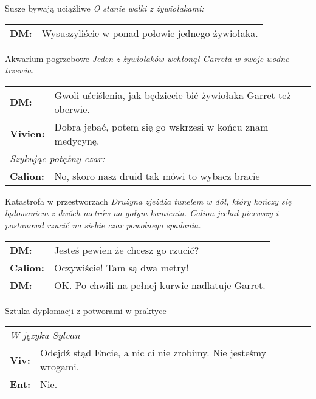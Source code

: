 \documentclass[10pt,twoside,twocolumn]{book}
\begin{document}
\begin{rpg-quotebox}{Susze bywają uciążliwe}
   \textit{O stanie walki z żywiołakami:}\\
   
   \begin{tabularx}{\columnwidth}{lX}
      \textbf{DM:} & Wysuszyliście w ponad połowie jednego żywiołaka.\\
   \end{tabularx}
\end{rpg-quotebox}

\begin{rpg-quotebox}{Akwarium pogrzebowe}
   \textit{Jeden z żywiołaków wchłonął Garreta w swoje wodne trzewia.}\\
   
   \begin{tabularx}{\columnwidth}{lX}
      \textbf{DM:} & Gwoli uściślenia, jak będziecie bić żywiołaka Garret też oberwie.\\
      \textbf{Vivien:} & Dobra jebać, potem się go wskrzesi w końcu znam medycynę.\\
      \multicolumn{2}{l}{\textit{Szykując potężny czar:}}\\
      \textbf{Calion:} & No, skoro nasz druid tak mówi to wybacz bracie\\
   \end{tabularx}
\end{rpg-quotebox}

\begin{rpg-quotebox}{Katastrofa w przestworzach}
   \textit{Drużyna zjeżdża tunelem w dół, który kończy się lądowaniem z dwóch metrów na gołym kamieniu. Calion jechał pierwszy i postanowił rzucić na siebie czar powolnego spadania.}\\
   
   \begin{tabularx}{\columnwidth}{lX}
      \textbf{DM:} & Jesteś pewien że chcesz go rzucić?\\
      \textbf{Calion:} & Oczywiście! Tam są dwa metry!\\
      \textbf{DM:} & OK. Po chwili na pełnej kurwie nadlatuje Garret.\\
   \end{tabularx}
\end{rpg-quotebox}

\begin{rpg-quotebox}{Sztuka dyplomacji z potworami w praktyce}
   \begin{tabularx}{\columnwidth}{lX}
      \multicolumn{2}{l}{\textit{W języku Sylvan}}\\
      \textbf{Viv:} & Odejdź stąd Encie, a nic ci nie zrobimy. Nie jesteśmy wrogami.\\
      \textbf{Ent:} & Nie.\\
   \end{tabularx}
\end{rpg-quotebox}
\end{document}
